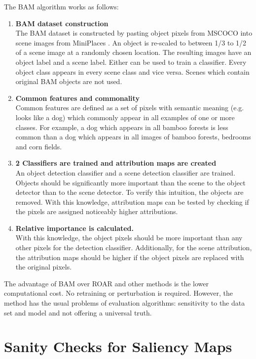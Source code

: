 The BAM algorithm works as follows:
\begin{enumerate}
	\item \textbf{BAM dataset construction}\\
	The BAM dataset is constructed by pasting object pixels from MSCOCO \cite{lin2015microsoft} into scene images from MiniPlaces \cite{zhou2016places}. An object is re-scaled to between 1/3 to 1/2 of a scene image at a randomly chosen location. The resulting images have an object label and a scene label. Either can be used to train a classifier. Every object class appears in every scene class and vice versa. Scenes which contain original BAM objects are not used.
	\item \textbf{Common features and commonality}\\
	Common features are defined as a set of pixels with semantic meaning (e.g. looks like a dog) which commonly appear in all examples of one or more classes. For example, a dog which appears in all bamboo forests is less common than a dog which appears in all images of bamboo forests, bedrooms and corn fields.
	\item \textbf{2 Classifiers are trained and attribution maps are created}\\
	An object detection classifier and a scene detection classifier are trained. Objects should be significantly more important than the scene to the object detector than to the scene detector. To verify this intuition, the objects are removed. With this knowledge, attribution maps can be tested by checking if the pixels are assigned noticeably higher attributions.
	\item \textbf{Relative importance is calculated.}\\
	With this knowledge, the object pixels should be more important than any other pixels for the detection classifier. Additionally, for the scene attribution, the attribution maps should be higher if the object pixels are replaced with the original pixels.
\end{enumerate}


The advantage of BAM over ROAR \cite{hooker2019benchmark} and other methods is the lower computational cost. No retraining or perturbation is required. However, the method has the usual problems of evaluation algorithms: sensitivity to the data set and model and not offering a universal truth.


\section{Sanity Checks for Saliency Maps \cite{adebayo2020sanity}}

